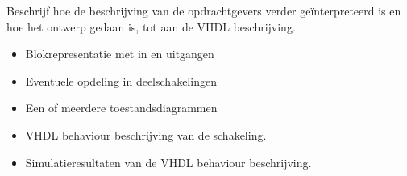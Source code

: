 Beschrijf hoe de beschrijving van de opdrachtgevers verder geïnterpreteerd is en hoe het ontwerp gedaan is, tot aan de VHDL beschrijving.
\begin{itemize}
\item
Blokrepresentatie met in en uitgangen
\item
Eventuele opdeling in deelschakelingen
\item
Een of meerdere toestandsdiagrammen 
\item
VHDL behaviour beschrijving van de schakeling.
\item
Simulatieresultaten van de VHDL behaviour beschrijving.
\end{itemize}